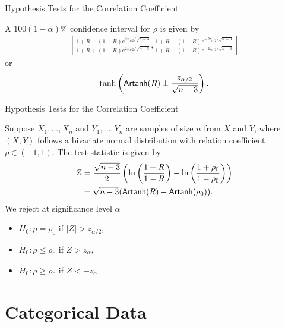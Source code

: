 \begin{frame}{Hypothesis Tests for the Correlation Coefficient}

\justifying
{} A $100(1-\alpha)\%$ confidence interval for $\rho$ is given by
\begin{align*}
\left[\frac{1+R-(1-R)e^{2z_{\alpha/2}/\sqrt{n-3}}}{1+R+(1-R)e^{2z_{\alpha/2}/\sqrt{n-3}}},  \frac{1+R-(1-R)e^{-2z_{\alpha/2}/\sqrt{n-3}}}{1+R+(1-R)e^{-2z_{\alpha/2}/\sqrt{n-3}}}\right]
\end{align*}
or
\begin{align*}
\tanh\left(\mathsf{Artanh}(R) \pm \frac{z_{\alpha/2}}{\sqrt{n-3}} \right).
\end{align*}


\end{frame}


\begin{frame}{Hypothesis Tests for the Correlation Coefficient}

\justifying
Suppose $X_1, \ldots, X_n$ and $Y_1, \ldots, Y_n$ are samples of size $n$ from $X$ and $Y$, where $(X, Y)$ follows a bivariate normal distribution with relation coefficient $\rho\in (-1, 1)$. The test statistic is given by
\begin{align*}
Z & = \frac{\sqrt{n-3}}{2}\left(\ln\left(\frac{1+R}{1-R} \right) - \ln\left(\frac{1+\rho_0}{1-\rho_0} \right) \right) \\
& = \sqrt{n-3}(\mathsf{Artanh}(R) - \mathsf{Artanh}(\rho_0)).
\end{align*}
We reject at significance level $\alpha$
\begin{itemize}
	\item $H_0: \rho = \rho_0$ if $|Z| > z_{\alpha/2}$,
	\item $H_0: \rho \leq \rho_0$ if $Z > z_{\alpha}$,
	\item $H_0: \rho \geq \rho_0$ if $Z < -z_{\alpha}$.
\end{itemize}


\end{frame}


\section{Categorical Data}

